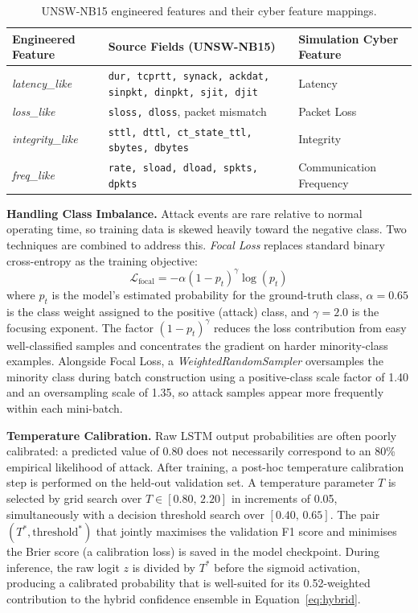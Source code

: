 \begin{table}[H]
\centering
\caption{UNSW-NB15 engineered features and their cyber feature mappings.}
\label{tab:unsw_feature_map}
\begin{tabular}{|l|l|l|}
\hline
\textbf{Engineered Feature} & \textbf{Source Fields (UNSW-NB15)} & \textbf{Simulation Cyber Feature} \\
\hline
\textit{latency\_like} & \texttt{dur, tcprtt, synack, ackdat, sinpkt, dinpkt, sjit, djit} & Latency \\
\textit{loss\_like} & \texttt{sloss, dloss}, packet mismatch & Packet Loss \\
\textit{integrity\_like} & \texttt{sttl, dttl, ct\_state\_ttl, sbytes, dbytes} & Integrity \\
\textit{freq\_like} & \texttt{rate, sload, dload, spkts, dpkts} & Communication Frequency \\
\hline
\end{tabular}
\end{table}

\par \vspace{0.35cm}
\noindent
\textbf{Handling Class Imbalance.} Attack events are rare relative to normal operating time, so training data is skewed heavily toward the negative class. Two techniques are combined to address this. \textit{Focal Loss} replaces standard binary cross-entropy as the training objective:
\begin{equation}
\mathcal{L}_{\text{focal}} = -\alpha \left(1 - p_t\right)^{\gamma} \log(p_t)
\label{eq:focal}
\end{equation}
where $p_t$ is the model's estimated probability for the ground-truth class, $\alpha = 0.65$ is the class weight assigned to the positive (attack) class, and $\gamma = 2.0$ is the focusing exponent. The factor $(1 - p_t)^\gamma$ reduces the loss contribution from easy well-classified samples and concentrates the gradient on harder minority-class examples. Alongside Focal Loss, a \textit{WeightedRandomSampler} oversamples the minority class during batch construction using a positive-class scale factor of 1.40 and an oversampling scale of 1.35, so attack samples appear more frequently within each mini-batch.

\par \vspace{0.35cm}
\noindent
\textbf{Temperature Calibration.} Raw LSTM output probabilities are often poorly calibrated: a predicted value of 0.80 does not necessarily correspond to an 80\% empirical likelihood of attack. After training, a post-hoc temperature calibration step is performed on the held-out validation set. A temperature parameter $T$ is selected by grid search over $T \in [0.80,\, 2.20]$ in increments of 0.05, simultaneously with a decision threshold search over $[0.40,\, 0.65]$. The pair $(T^*, \text{threshold}^*)$ that jointly maximises the validation F1 score and minimises the Brier score (a calibration loss) is saved in the model checkpoint. During inference, the raw logit $z$ is divided by $T^*$ before the sigmoid activation, producing a calibrated probability that is well-suited for its 0.52-weighted contribution to the hybrid confidence ensemble in Equation~\ref{eq:hybrid}.

